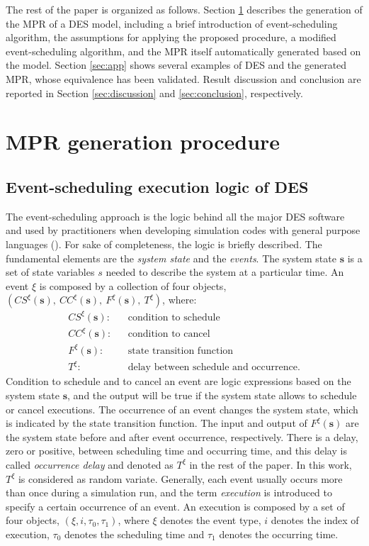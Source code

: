 \documentclass[suppldata]{interact}
\theoremstyle{plain}
\theoremstyle{definition}
\theoremstyle{remark}
\begin{document}
The rest of the paper is organized as follows. Section \ref{sec:MPR} describes the generation of the MPR of a DES model, including a brief introduction of event-scheduling algorithm, the assumptions for applying the proposed procedure, a modified event-scheduling algorithm, and the MPR itself automatically generated based on the model. Section \ref{sec:app} shows several examples of DES and the generated MPR, whose equivalence has been validated. Result discussion and conclusion are reported in Section \ref{sec:discussion} and \ref{sec:conclusion}, respectively.


\section{MPR generation procedure} \label{sec:MPR}
\subsection{Event-scheduling execution logic of DES } \label{sec:SimAlgo}
The event-scheduling approach is the logic behind all the major DES software and used by practitioners when developing simulation codes with general purpose languages (\cite{law2014simulation}). For sake of completeness, the logic is briefly described. The fundamental elements are the \textit{system state} and the \textit{events}. The system state $\textbf{s}$ is a set of state variables $s$ needed to describe the system at a particular time. An event $\xi$ is composed by a collection of four objects, $(CS^{\xi}(\textbf{s}),\ CC^{\xi}(\textbf{s}),\ F^{\xi}(\textbf{s}),\ T^{\xi})$, where:
\begin{eqnarray}
	CS^{\xi}(\textbf{s}): && \text{condition to schedule}\nonumber\\
	CC^{\xi}(\textbf{s}): && \text{condition to cancel}\nonumber\\
	F^{\xi}(\textbf{s}): && \text{state transition function}\nonumber\\
	T^{\xi}: && \text{delay between schedule and occurrence.}\nonumber
\end{eqnarray}
Condition to schedule and to cancel an event are logic expressions based on the system state $\textbf{s}$, and the output will be true if the system state allows to schedule or cancel executions. The occurrence of an event changes the system state, which is indicated by the state transition function. The input and output of $F^{\xi}(\textbf{s})$ are the system state before and after event occurrence, respectively. There is a delay, zero or positive, between scheduling time and occurring time, and this delay is called \textit{occurrence delay} and denoted as $T^{\xi}$ in the rest of the paper. In this work, $T^{\xi}$ is considered as random variate. Generally, each event usually occurs more than once during a simulation run, and the term \textit{execution} is introduced to specify a certain occurrence of an event. An execution is composed by a set of four objects, $(\xi,i,\tau_0,\tau_1)$, where $\xi$ denotes the event type, $i$ denotes the index of execution, $\tau_0$ denotes the scheduling time and $\tau_1$ denotes the occurring time. 
\end{document}
